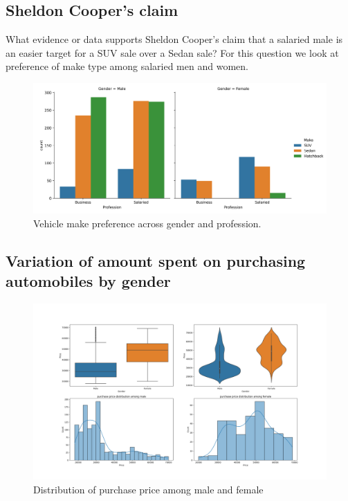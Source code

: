 \documentclass[12pt,a4paper]{style}
\begin{document}
    \subsection{Sheldon Cooper's claim}
    What evidence or data supports Sheldon Cooper's claim that a salaried male is an easier target for a SUV sale over a Sedan sale? For this question we look at preference of make type among salaried men and women. 
    \begin{figure}[h]
    	\centering
    	\includegraphics[width=\linewidth]{make_gender_prof_catplot.png}
    	\caption{Vehicle make preference across gender and profession.}
    \end{figure}
    
    \subsection{Variation of amount spent on purchasing automobiles by gender}
    \begin{figure}[h]
    	\centering
    	\includegraphics[width=\linewidth]{purchase_gender_dist.png}
    	\caption{Distribution of purchase price among male and female}
    \end{figure}
    
\end{document}
